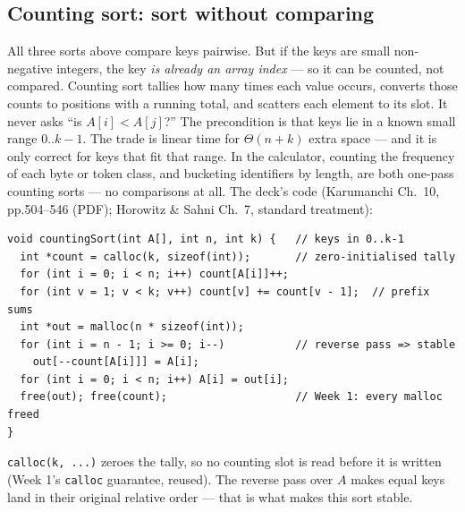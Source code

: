 \documentclass[11pt]{article}
\begin{document}
\subsection{Counting sort: sort without comparing}

All three sorts above compare keys pairwise. But if the keys are small non-negative integers, the key \emph{is already an array index} --- so it can be counted, not compared. Counting sort tallies how many times each value occurs, converts those counts to positions with a running total, and scatters each element to its slot. It never asks ``is $A[i] < A[j]$?'' The precondition is that keys lie in a known small range $0..k-1$. The trade is linear time for $\Theta(n + k)$ extra space --- and it is only correct for keys that fit that range. In the calculator, counting the frequency of each byte or token class, and bucketing identifiers by length, are both one-pass counting sorts --- no comparisons at all. The deck's code (Karumanchi Ch.~10, pp.504--546 (PDF); Horowitz \& Sahni Ch.~7, standard treatment):

{\footnotesize
\begin{verbatim}
void countingSort(int A[], int n, int k) {   // keys in 0..k-1
  int *count = calloc(k, sizeof(int));       // zero-initialised tally
  for (int i = 0; i < n; i++) count[A[i]]++;
  for (int v = 1; v < k; v++) count[v] += count[v - 1];  // prefix sums
  int *out = malloc(n * sizeof(int));
  for (int i = n - 1; i >= 0; i--)           // reverse pass => stable
    out[--count[A[i]]] = A[i];
  for (int i = 0; i < n; i++) A[i] = out[i];
  free(out); free(count);                    // Week 1: every malloc freed
}
\end{verbatim}
}

\texttt{calloc(k, ...)} zeroes the tally, so no counting slot is read before it is written (Week 1's \texttt{calloc} guarantee, reused). The reverse pass over $A$ makes equal keys land in their original relative order --- that is what makes this sort stable.
\end{document}
